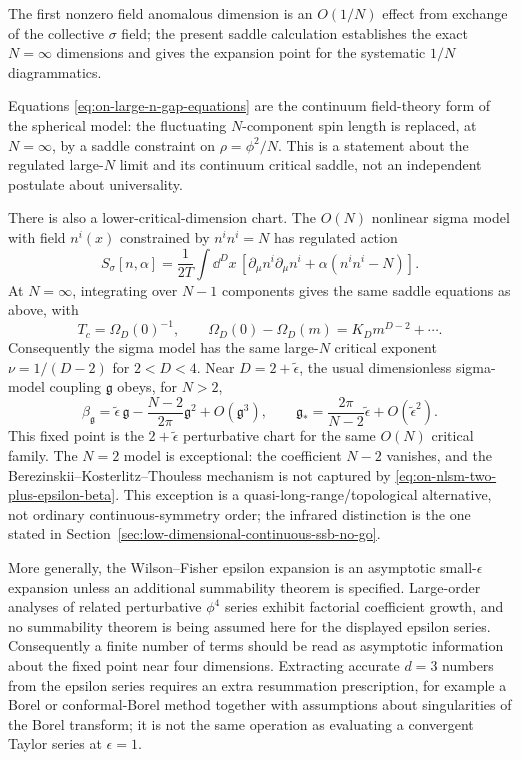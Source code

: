 The first nonzero field anomalous dimension is an \(O(1/N)\) effect from
exchange of the collective \(\sigma\) field; the present saddle calculation
establishes the exact \(N=\infty\) dimensions and gives the expansion point
for the systematic \(1/N\) diagrammatics.

Equations \eqref{eq:on-large-n-gap-equations} are the continuum
field-theory form of the spherical model: the fluctuating \(N\)-component spin
length is replaced, at \(N=\infty\), by a saddle constraint on
\(\rho=\phi^2/N\).  This is a statement about the regulated large-\(N\)
limit and its continuum critical saddle, not an independent postulate about
universality.

There is also a lower-critical-dimension chart.  The \(O(N)\) nonlinear sigma
model with field \(n^i(x)\) constrained by \(n^in^i=N\) has regulated action
\begin{equation}
  S_\sigma[n,\alpha]
  =
  \frac1{2T}
  \int\dd^D x\,
  \left[
    \partial_\mu n^i\partial_\mu n^i
    +\alpha(n^in^i-N)
  \right].
  \label{eq:on-nonlinear-sigma-action}
\end{equation}
At \(N=\infty\), integrating over \(N-1\) components gives the same saddle
equations as above, with
\[
  T_c=\Omega_D(0)^{-1},
  \qquad
  \Omega_D(0)-\Omega_D(m)
  =
  K_Dm^{D-2}+\cdots .
\]
Consequently the sigma model has the same large-\(N\) critical exponent
\(\nu=1/(D-2)\) for \(2<D<4\).  Near \(D=2+\widetilde\epsilon\), the usual
dimensionless sigma-model coupling \(\mathfrak g\) obeys, for \(N>2\),
\begin{equation}
  \beta_{\mathfrak g}
  =
  \widetilde\epsilon\,\mathfrak g
  -\frac{N-2}{2\pi}\mathfrak g^2
  +O(\mathfrak g^3),
  \qquad
  \mathfrak g_*
  =
  \frac{2\pi}{N-2}\widetilde\epsilon
  +O(\widetilde\epsilon^2).
  \label{eq:on-nlsm-two-plus-epsilon-beta}
\end{equation}
This fixed point is the \(2+\widetilde\epsilon\) perturbative chart for the
same \(O(N)\) critical family.  The \(N=2\) model is exceptional: the
coefficient \(N-2\) vanishes, and the Berezinskii--Kosterlitz--Thouless
mechanism is not captured by \eqref{eq:on-nlsm-two-plus-epsilon-beta}.
This exception is a quasi-long-range/topological alternative, not ordinary
continuous-symmetry order; the infrared distinction is the one stated in
Section~\ref{sec:low-dimensional-continuous-ssb-no-go}.

More generally, the Wilson--Fisher epsilon expansion is an asymptotic
small-\(\epsilon\) expansion unless an additional summability theorem is
specified.  Large-order analyses of related perturbative \(\phi^4\) series
exhibit factorial coefficient growth, and no summability theorem is being
assumed here for the displayed epsilon series.  Consequently a finite number
of terms should be read as asymptotic information about the fixed point near
four dimensions.  Extracting accurate \(d=3\) numbers from the epsilon series
requires an extra resummation prescription, for example a Borel or
conformal-Borel method together with assumptions about singularities of the
Borel transform; it is not the same operation as evaluating a convergent Taylor
series at \(\epsilon=1\).

